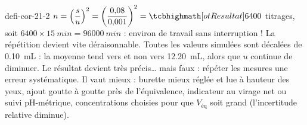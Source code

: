 \begin{blocEdition}{defi-cor-21-2}
$n=\left(\dfrac{s}{u}\right)^2=\left(\dfrac{0{,}08}{0{,}001}\right)^2=\res{\num{6400}}$ titrages, soit $6400\times\qty{15}{min}=\qty{96000}{min}$ : environ  de travail sans
interruption ! La répétition devient vite déraisonnable.
Toutes les valeurs simulées sont décalées de \qty{0,10}{mL} : la moyenne tend vers  et non vers \qty{12,20}{mL}, alors que $u$
continue de diminuer. Le résultat devient très précis\dots{} mais faux : répéter les mesures  une erreur systématique.
Il vaut mieux  : burette mieux réglée et lue à hauteur des yeux, ajout goutte à goutte près de l'équivalence,
indicateur au virage net ou suivi pH-métrique, concentrations choisies pour que $V_\text{éq}$ soit grand (l'incertitude relative diminue).
\end{blocEdition}
